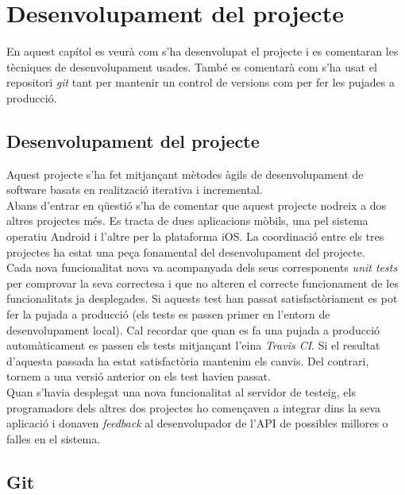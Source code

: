 \chapter{Desenvolupament del projecte}\label{desenvolupament}

En aquest capítol es veurà com s'ha desenvolupat el projecte i es comentaran les tècniques de desenvolupament usades. També es comentarà com s'ha usat el repositori \emph{git} tant per mantenir un control de versions com per fer les pujades a producció.

\section{Desenvolupament del projecte}
Aquest projecte s'ha fet mitjançant mètodes àgils de desenvolupament de software basats en realització iterativa i incremental.\\

Abans d'entrar en qüestió s'ha de comentar que aquest projecte nodreix a dos altres projectes més. Es tracta de dues aplicacions mòbils, una pel sistema operatiu Android i l'altre per la plataforma iOS. La coordinació entre els tres projectes ha estat una peça fonamental del desenvolupament del projecte.\\

Cada nova funcionalitat nova va acompanyada dels seus corresponents \emph{unit tests} per comprovar la seva correctesa i que no alteren el correcte funcionament de les funcionalitats ja desplegades. Si aquests test han passat satisfactòriament es pot fer la pujada a producció (els tests es passen primer en l'entorn de desenvolupament local). Cal recordar que quan es fa una pujada a producció automàticament es passen els tests mitjançant l'eina \emph{Travis CI}. Si el resultat d'aquesta passada ha estat satisfactòria mantenim els canvis. Del contrari, tornem a una versió anterior on els test havien passat.\\

Quan s'havia desplegat una nova funcionalitat al servidor de testeig, els programadors dels altres dos projectes ho començaven a integrar dins la seva aplicació i donaven \emph{feedback} al desenvolupador de l'\ac{API} de possibles millores o falles en el sistema.

\section{Git}

